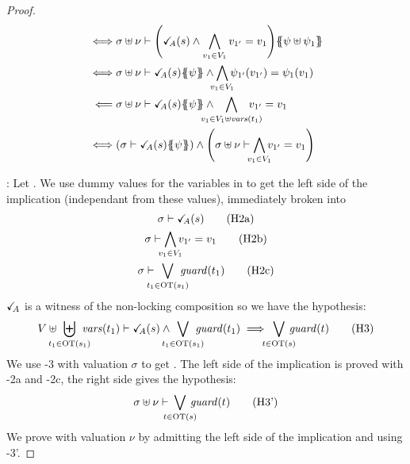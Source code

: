 \documentclass{article}
\begin{document}
\begin{proof}
\begin{align*}
		\iff & \sigma \uplus \nu \vdash \mpar{\reach{A}\mpar{s} \wedge \bigwedge_{v_1 \in V_1} v_{1'} = v_1}\psubst{\psi \uplus \psi_1} \\
		\iff & \sigma \uplus \nu \vdash \reach{A}\mpar{s}\psubst{\psi} \wedge \bigwedge_\subbox{v_1 \in V_1} \psi_{1'}\mpar{v_{1'}} = \psi_1\mpar{v_1} \\
		\impliedby & \sigma \uplus \nu \vdash \reach{A}\mpar{s}\psubst{\psi} \wedge \bigwedge_\subbox{v_1 \in V_1 \uplus \fvars{t_1}} v_{1'} = v_1 \\
		\iff & \mpar{\sigma \vdash \reach{A}\mpar{s}\psubst{\psi}} \wedge \mpar{\sigma \uplus \nu \vdash \bigwedge_\subbox{v_1 \in V_1} v_{1'} = v_1}
	\end{align*}
\item[\goal{1}:] Let .
	We use dummy values for the variables in  to get the left side of the implication (independant from these values), immediately broken into
	\begin{gather}
		\sigma \vdash \reach{A}\mpar{s} \hyp{2a} \\
		\sigma \vdash \bigwedge_\subbox{v_1 \in V_1} v_{1'} = v_1 \hyp{2b} \\
		\sigma \vdash \bigvee_\subbox{t_1 \in \fOT{s_1}} \fguard{t_1} \hyp{2c}
	\end{gather}
	\(\checkmark_{\!\! A}\) is a witness of the non-locking composition so we have the hypothesis:
	\[ V \uplus \biguplus_\subbox{t_1 \in \fOT{s_1}} \fvars{t_1} \vdash \reach{A}\mpar{s} \wedge \bigvee_\subbox{t_1 \in \fOT{s_1}} \fguard{t_1} \implies \bigvee_\subbox{t \in \fOT{s}} \fguard{t} \hyp{3} \]
	We use \hyp{3} with valuation \(\sigma\) to get .
	The left side of the implication is proved with \hyp{2a} and \hyp{2c}, the right side gives the hypothesis:
	\[ \sigma \uplus \nu \vdash \bigvee_\subbox{t \in \fOT{s}} \fguard{t} \hyp{3'} \]
	We prove  with valuation \(\nu\) by admitting the left side of the implication and using \hyp{3'}.
\end{proof}
\end{document}
